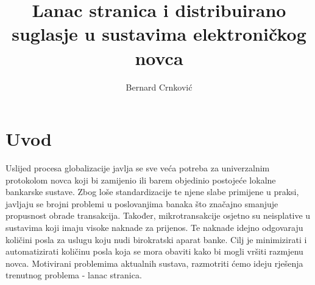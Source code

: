 \documentclass[utf8, zavrsni]{fer}
\begin{document}

\title{Lanac stranica i distribuirano suglasje u sustavima elektroničkog novca}

\author{Bernard Crnković}

\maketitle

\izvornik

\zahvala{}

\tableofcontents

\chapter{Uvod}
Uslijed procesa globalizacije javlja se sve veća potreba za univerzalnim protokolom novca koji bi zamijenio ili barem objedinio postojeće lokalne bankarske sustave. Zbog loše standardizacije te njene slabe primijene u praksi, javljaju se brojni problemi u poslovanjima banaka što značajno smanjuje propusnost obrade transakcija. Također, mikrotransakcije osjetno su neisplative u sustavima koji imaju visoke naknade za prijenos. Te naknade idejno odgovaraju količini posla za uslugu koju nudi birokratski aparat banke. Cilj je minimizirati i automatizirati količinu posla koja se mora obaviti kako bi mogli vršiti razmjenu novca. Motivirani problemima aktualnih sustava, razmotriti ćemo ideju rješenja trenutnog problema - lanac stranica.
\end{document}

